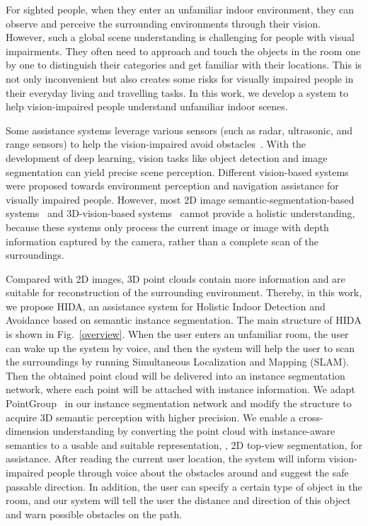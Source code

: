 \documentclass[10pt,twocolumn,letterpaper]{article}
\begin{document}
For sighted people, when they enter an unfamiliar indoor environment, they can observe and perceive the surrounding environments through their vision. However, such a global scene understanding is challenging for people with visual impairments. They often need to approach and touch the objects in the room one by one to distinguish their categories and get familiar with their locations. This is not only inconvenient but also creates some risks for visually impaired people in their everyday living and travelling tasks. In this work, we develop a system to help vision-impaired people understand unfamiliar indoor scenes.

Some assistance systems leverage various sensors (such as radar, ultrasonic, and range sensors) to help the vision-impaired avoid obstacles~\cite{bai2017smart,katzschmann2018safe,long2019unifying,zhang2017indoor}. With the development of deep learning, vision tasks like object detection and image segmentation can yield precise scene perception. Different vision-based systems were proposed towards environment perception and navigation assistance for visually impaired people. However, most 2D image semantic-segmentation-based systems~\cite{lin2019deep,wang2018environmental,yang2018unifying} and 3D-vision-based systems~\cite{bauer2020enhancing,caraiman2017computer,yang2015new} cannot provide a holistic understanding, because these systems only process the current image or image with depth information captured by the camera, rather than a complete scan of the surroundings.

Compared with 2D images, 3D point clouds contain more information and are suitable for reconstruction of the surrounding environment. Thereby, in this work, we propose HIDA, an assistance system for Holistic Indoor Detection and Avoidance based on semantic instance segmentation. The main structure of HIDA is shown in Fig.~\ref{overview}. When the user enters an unfamiliar room, the user can wake up the system by voice, and then the system will help the user to scan the surroundings by running Simultaneous Localization and Mapping (SLAM). Then the obtained point cloud will be delivered into an instance segmentation network, where each point will be attached with instance information. We adapt PointGroup~\cite{pointgroup} in our instance segmentation network and modify the structure to acquire 3D semantic perception with higher precision. We enable a cross-dimension understanding by converting the point cloud with instance-aware semantics to a usable and suitable representation, \ie, 2D top-view segmentation, for assistance. After reading the current user location, the system will inform vision-impaired people through voice about the obstacles around and suggest the safe passable direction. In addition, the user can specify a certain type of object in the room, and our system will tell the user the distance and direction of this object and warn possible obstacles on the path.
\end{document}
